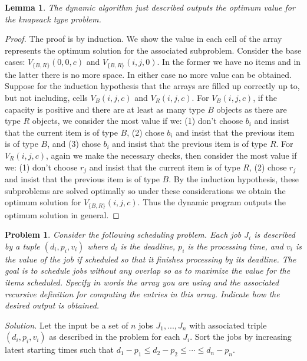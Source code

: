\documentclass[11pt]{article}
\newtheorem{lemma}[theorem]{Lemma}
\newtheorem{problem}{Problem}
\begin{document}
\begin{lemma}
The dynamic algorithm just described outputs the optimum value for the knapsack type problem.
\end{lemma}
\begin{proof}
The proof is by induction. We show the value in each cell of the array represents the optimum solution for the associated subproblem. Consider the base cases: $V_{\{B,R\}}(0,0,c)$ and $V_{\{B, R\}}(i,j,0)$. In the former we have no items and in the latter there is no more space. In either case no more value can be obtained. Suppose for the induction hypothesis that the arrays are filled up correctly up to, but not including, cells $V_B(i,j,c)$ and $V_R(i,j,c)$. For $V_B(i,j,c)$, if the capacity is positive and there are at least as many type $B$ objects as there are type $R$ objects, we consider the most value if we: (1) don't choose $b_i$ and insist that the current item is of type $B$, (2) chose $b_i$ and insist that the previous item is of type $B$, and (3) chose $b_i$ and insist that the previous item is of type $R$. For $V_R(i,j,c)$, again we make the necessary checks, then consider the most value if we: (1) don't choose $r_j$ and insist that the current item is of type $R$, (2) chose $r_j$ and insist that the previous item is of type $B$. By the induction hypothesis, these subproblems are solved optimally so under these considerations we obtain the optimum solution for $V_{\{B, R\}}(i,j,c)$. Thus the dynamic program outputs the optimum solution in general. 
\end{proof}

\begin{problem}
Consider the following scheduling problem. Each job $J_i$ is described by a tuple $(d_i, p_i, v_i)$ where $d_i$ is the deadline, $p_i$ is the processing time, and $v_i$ is the value of the job if scheduled so that it finishes processing by its deadline. The goal is to schedule jobs without any overlap so as to maximize the value for the items scheduled. Specify in words the array you are using and the associated recursive definition for computing the entries in this array. Indicate how the desired output is obtained. 
\end{problem}

\emph{Solution.}
Let the input be a set of $n$ jobs $J_1, ..., J_n$ with associated triple $(d_i, p_i, v_i)$ as described in the problem for each $J_i$. Sort the jobs by increasing latest starting times such that $d_1 - p_1 \leq d_2 - p_2 \leq \cdots \leq d_n - p_n$. 
\end{document}

